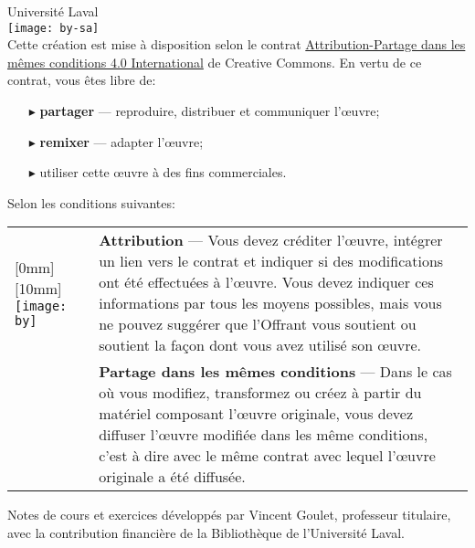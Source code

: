 
\begin{frame}[t,plain]
  \tiny
  \vspace*{10mm}

  {\textcopyright} {\year} Université Laval \\[4mm]

  \texttt{[image: by-sa]} \\%

  Cette création est mise à disposition selon le contrat
  \href{http://creativecommons.org/licenses/by-sa/4.0/deed.fr}{%
    Attribution-Partage dans les mêmes conditions 4.0 International}
  de Creative Commons. En vertu de ce contrat, vous êtes libre de:
  \begin{itemize}
  \item[\color{black}\tiny$\blacktriangleright$]%
    \textbf{partager} --- reproduire, distribuer et communiquer
    l'{\oe}uvre;
  \item[\color{black}\tiny$\blacktriangleright$]%
    \textbf{remixer} --- adapter l'{\oe}uvre;
  \item[\color{black}\tiny$\blacktriangleright$]
    utiliser cette {\oe}uvre à des fins commerciales.
  \end{itemize}
  Selon les conditions suivantes:
  \vspace*{2mm}

  \begin{tabularx}{\linewidth}{@{}lX@{}}
    \raisebox{-5.5mm}[0mm][10mm]{%
      \texttt{[image: by]}}
    & \textbf{Attribution} --- Vous devez créditer l'{\oe}uvre, intégrer
      un lien vers le contrat et indiquer si des modifications ont été
      effectuées à l'{\oe}uvre. Vous devez indiquer ces informations par
      tous les moyens possibles, mais vous ne pouvez suggérer que
      l'Offrant vous soutient ou soutient la façon dont vous avez
      utilisé son {\oe}uvre. \\
    \raisebox{-5.5mm}{\texttt{[image: sa]}}
    & \textbf{Partage dans les mêmes conditions} --- Dans le cas où
      vous modifiez, transformez ou créez à partir du matériel composant
      l'{\oe}uvre originale, vous devez diffuser l'{\oe}uvre modifiée
      dans les même conditions, c'est à dire avec le même contrat avec
      lequel l'{\oe}uvre originale a été diffusée.
  \end{tabularx}
  \vspace*{4mm}

  Notes de cours et exercices développés par Vincent Goulet,
  professeur titulaire, avec la contribution financière de la
  Bibliothèque de l'Université Laval.
\end{frame}

